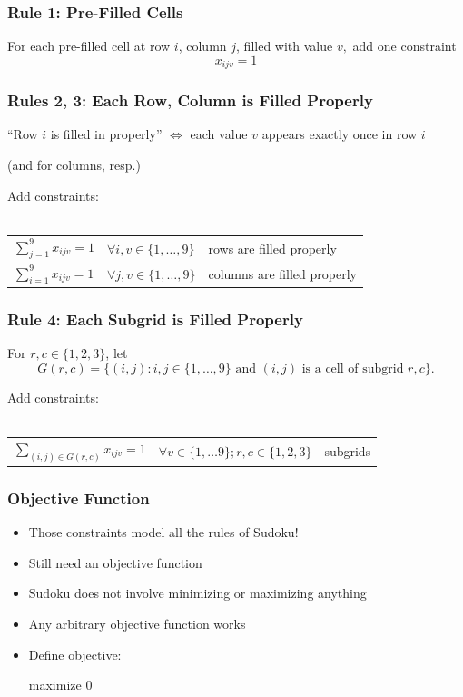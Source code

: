 \documentclass{beamer}
\newcommand{\stanza}{ \\~\ }
\begin{document}
\begin{frame} \frametitle{Rule 1: Pre-Filled Cells}

  For each pre-filled cell at row $i$, column $j$, filled with value $v,$ add one constraint
  \[ x_{ijv} =1 \]

\end{frame}

\begin{frame} \frametitle{Rules 2, 3: Each Row, Column is Filled Properly}

\begin{center}
  ``Row $i$ is filled in properly'' $\Leftrightarrow$ each value $v$ appears exactly once in row $i$

  (and for columns, resp.)
\end{center}

Add constraints:
\stanza

  \begin{tabular}{lll}
    $\sum_{j=1}^9 x_{ijv} = 1$ & $\forall i, v \in \{1, \ldots, 9\}$ & rows are filled properly \\
    $\sum_{i=1}^9 x_{ijv} = 1$ & $\forall j, v \in \{1, \ldots, 9\}$ & columns are filled properly
  \end{tabular}
\end{frame}

\begin{frame} \frametitle{Rule 4: Each Subgrid is Filled Properly}

  For $r, c \in \{1, 2, 3\}$, let
  \[ G(r, c) = \{
  (i, j) : i, j \in \{1, \ldots, 9\}
  \text{ and } (i, j)
  \text{ is a cell of subgrid } r, c
  \} . \]

  Add constraints:
  \stanza
  \begin{tabular}{lll}
    $\sum_{(i, j) \in G(r, c)} x_{ijv} = 1$ & $\forall v \in \{1, \ldots 9\}; r,c \in \{1, 2, 3\}$ & subgrids
  \end{tabular}
  
\end{frame}

\begin{frame} \frametitle{Objective Function}
  \begin{itemize}
    \item Those constraints model all the rules of Sudoku!
    \item Still need an objective function
    \item Sudoku does not involve minimizing or maximizing anything
    \item Any arbitrary objective function works
    \item Define objective:

      maximize 0

  \end{itemize}
\end{frame}
\end{document}
